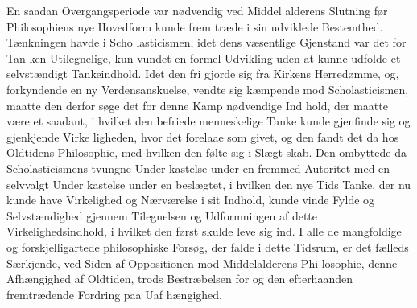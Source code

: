 \documentclass[12pt,a4paper]{book}
\begin{document}
En saadan Overgangsperiode var nødvendig ved Middel\-%
alderens Slutning før Philosophiens nye Hovedform kunde frem\-%
træde i sin udviklede Bestemthed. Tænkningen havde i Scho\-%
lasticismen, idet dens væsentlige Gjenstand var det for Tan\-%
ken Utilegnelige, kun vundet en formel Udvikling uden at
kunne udfolde et selvstændigt Tankeindhold. Idet den fri\-%
gjorde sig fra Kirkens Herredømme, og, forkyndende en ny
Verdensanskuelse, vendte sig kæmpende mod Scholasticismen,
maatte den derfor søge det for denne Kamp nødvendige Ind\-%
hold, der maatte være et saadant, i hvilket den befriede
menneskelige Tanke kunde gjenfinde sig og gjenkjende Virke\-%
ligheden, hvor det forelaae som givet, og den fandt det da
hos Oldtidens Philosophie, med hvilken den følte sig i Slægt\-%
skab. Den ombyttede da Scholasticismens tvungne Under\-%
kastelse under en fremmed Autoritet med en selvvalgt Under\-%
kastelse under en beslægtet, i hvilken den nye Tids Tanke,
der nu kunde have Virkelighed og Nærværelse i sit Indhold,
kunde vinde Fylde og Selvstændighed gjennem Tilegnelsen og
Udformningen af dette Virkelighedsindhold, i hvilket den først
skulde leve sig ind. I alle de mangfoldige og forskjelligartede
philosophiske Forsøg, der falde i dette Tidsrum, er det fælleds
Særkjende, ved Siden af Oppositionen mod Middelalderens Phi\-%
losophie, denne Afhængighed af Oldtiden, trods Bestræbelsen
for og den efterhaanden fremtrædende Fordring paa Uaf\-%
hængighed.
\end{document}

